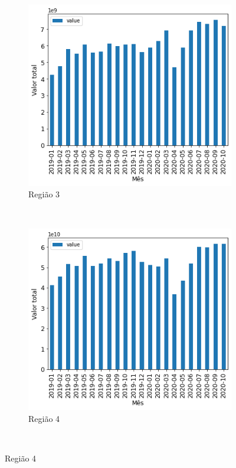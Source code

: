 \begin{figure}[htb]
\begin{subfigure}[b]{0.45\textwidth}
    \end{subfigure} ~ \\
    \begin{subfigure}[b]{0.45\textwidth}
        \includegraphics[scale=0.45]{images/base-de-dados-12.3-valor-mensal-por-regiao.png}
        \caption{Região 3}
        \label{fig:pandemia:descritiva-12.3-valor-mensal-por-regiao}
    \end{subfigure} ~ \quad
    \begin{subfigure}[b]{0.45\textwidth}
        \includegraphics[scale=0.45]{images/base-de-dados-12.4-valor-mensal-por-regiao.png}
        \caption{Região 4}
        \label{fig:pandemia:descritiva-12.4-valor-mensal-por-regiao}
    \end{subfigure} ~ \\

\end{figure}
